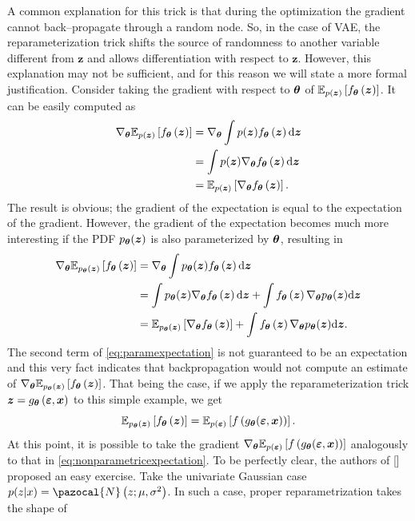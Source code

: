 A common explanation for this trick is that during the optimization the gradient cannot back--propagate through a random node. So, in the case of VAE, the reparameterization trick shifts the source of randomness to another variable different from $\boldsymbol{z}$ and allows differentiation with respect to $\boldsymbol{z}$. However, this explanation may not be sufficient, and for this reason we will state a more formal justification. Consider taking the gradient with respect to $\boldsymbol{\theta}$ of $\mathbb{E}_{p(\boldsymbol{z})}\left[f_{\boldsymbol{\theta}}\left(\boldsymbol{z}\right) \right]$. It can be easily computed as
\begin{align}
    \nabla_{\boldsymbol{\theta}}  \mathbb{E}_{p(\boldsymbol{z})}\left[f_{\boldsymbol{\theta}}\left(\boldsymbol{z}\right) \right] &= \nabla_{\boldsymbol{\theta}} \int p(\boldsymbol{z}) f_{\boldsymbol{\theta}}\left(\boldsymbol{z}\right) \mathrm{d}{\boldsymbol{z}} \\
    &= \int p(\boldsymbol{z}) \nabla_{\boldsymbol{\theta}} f_{\boldsymbol{\theta}}\left(\boldsymbol{z}\right) \mathrm{d}{\boldsymbol{z}} \\
    &=  \mathbb{E}_{p(\boldsymbol{z})}\left[\nabla_{\boldsymbol{\theta}}f_{\boldsymbol{\theta}}\left(\boldsymbol{z}\right) \right].\label{eq:nonparametricexpectation}
\end{align}
The result is obvious; the gradient of the expectation is equal to the expectation of the gradient. However, the gradient of the expectation becomes much more interesting if the PDF $p_{\boldsymbol{\theta}}(\boldsymbol{z})$ is also parameterized by $\boldsymbol{\theta}$, resulting in 
\begin{align}
    \nabla_{\boldsymbol{\theta}}  \mathbb{E}_{p_{\boldsymbol{\theta}}(\boldsymbol{z})}\left[f_{\boldsymbol{\theta}}\left(\boldsymbol{z}\right) \right] &= \nabla_{\boldsymbol{\theta}} \int p_{\boldsymbol{\theta}}(\boldsymbol{z}) f_{\boldsymbol{\theta}}\left(\boldsymbol{z}\right) \mathrm{d}{\boldsymbol{z}} \\
    &= \int p_{\boldsymbol{\theta}}(\boldsymbol{z}) \nabla_{\boldsymbol{\theta}} f_{\boldsymbol{\theta}}\left(\boldsymbol{z}\right) \mathrm{d}{\boldsymbol{z}} + \int  f_{\boldsymbol{\theta}}\left(\boldsymbol{z}\right) \nabla_{\boldsymbol{\theta}}p_{\boldsymbol{\theta}}(\boldsymbol{z})\mathrm{d}{\boldsymbol{z}} \\
    &=  \mathbb{E}_{p_{\boldsymbol{\theta}}(\boldsymbol{z})}\left[\nabla_{\boldsymbol{\theta}}f_{\boldsymbol{\theta}}\left(\boldsymbol{z}\right) \right] + \int  f_{\boldsymbol{\theta}}\left(\boldsymbol{z}\right) \nabla_{\boldsymbol{\theta}}p_{\boldsymbol{\theta}}(\boldsymbol{z})\mathrm{d}{\boldsymbol{z}}. \label{eq:paramexpectation}
\end{align}
The second term of \eqref{eq:paramexpectation} is not guaranteed to be an expectation and this very fact indicates that backpropagation would not compute an estimate of $\nabla_{\boldsymbol{\theta}}  \mathbb{E}_{p_{\boldsymbol{\theta}}(\boldsymbol{z})}\left[f_{\boldsymbol{\theta}}\left(\boldsymbol{z}\right) \right]$. That being the case, if we apply the reparameterization trick $\boldsymbol{z} =g_{\boldsymbol{\theta}}\left(\boldsymbol{\varepsilon},\boldsymbol{x}\right)$ to this simple example, we get
\begin{equation}
\mathbb{E}_{p_{\boldsymbol{\theta}}(\boldsymbol{z})}\left[f_{\boldsymbol{\theta}}\left(\boldsymbol{z}\right) \right] = \mathbb{E}_{p(\boldsymbol{\varepsilon})}\left[f\left(g_{\boldsymbol{\theta}}(\boldsymbol{\varepsilon}, \boldsymbol{x})\right) \right].
\end{equation}
At this point, it is possible to take the gradient $\nabla_{\boldsymbol{\theta}} \mathbb{E}_{p(\boldsymbol{\varepsilon})}\left[f\left(g_{\boldsymbol{\theta}}(\boldsymbol{\varepsilon}, \boldsymbol{x})\right) \right]$ analogously to that in \eqref{eq:nonparametricexpectation}. To be perfectly clear, the authors of [] proposed an easy exercise. Take the univariate Gaussian case $p(z|x) = \pazocal{N}\left(z;\mu, \sigma^2\right)$. In such a case, proper reparametrization takes the shape of
